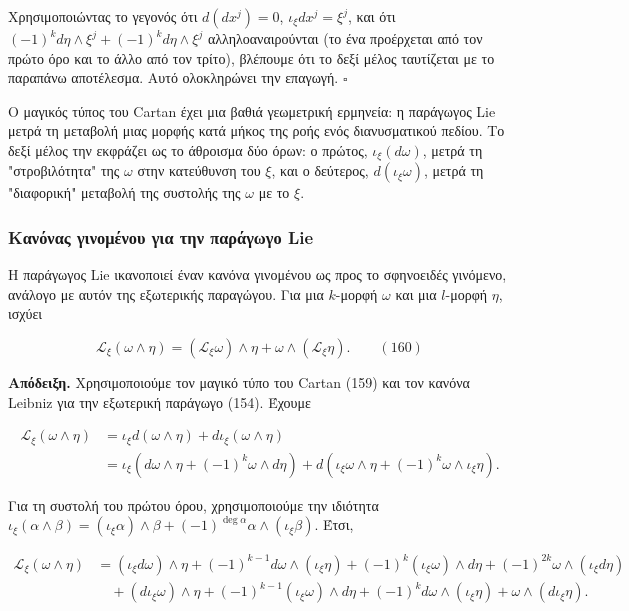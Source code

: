 \documentclass[12pt]{article}
\begin{document}
Χρησιμοποιώντας το γεγονός ότι $d(dx^j) = 0$, $\iota_\xi dx^j = \xi^j$, και ότι $(-1)^k d\eta \wedge \xi^j + (-1)^k d\eta \wedge \xi^j$ αλληλοαναιρούνται (το ένα προέρχεται από τον πρώτο όρο και το άλλο από τον τρίτο), βλέπουμε ότι το δεξί μέλος ταυτίζεται με το παραπάνω αποτέλεσμα. Αυτό ολοκληρώνει την επαγωγή. $\square$

Ο μαγικός τύπος του Cartan έχει μια βαθιά γεωμετρική ερμηνεία: η παράγωγος Lie μετρά τη μεταβολή μιας μορφής κατά μήκος της ροής ενός διανυσματικού πεδίου. Το δεξί μέλος την εκφράζει ως το άθροισμα δύο όρων: ο πρώτος, $\iota_\xi (d\omega)$, μετρά τη "στροβιλότητα" της $\omega$ στην κατεύθυνση του $\xi$, και ο δεύτερος, $d(\iota_\xi \omega)$, μετρά τη "διαφορική" μεταβολή της συστολής της $\omega$ με το $\xi$.

\subsubsection{Κανόνας γινομένου για την παράγωγο Lie}

Η παράγωγος Lie ικανοποιεί έναν κανόνα γινομένου ως προς το σφηνοειδές γινόμενο, ανάλογο με αυτόν της εξωτερικής παραγώγου. Για μια $k$-μορφή $\omega$ και μια $l$-μορφή $\eta$, ισχύει

\[
\mathcal{L}_\xi (\omega \wedge \eta) = (\mathcal{L}_\xi \omega) \wedge \eta + \omega \wedge (\mathcal{L}_\xi \eta). \qquad (160)
\]

\textbf{Απόδειξη.} Χρησιμοποιούμε τον μαγικό τύπο του Cartan (159) και τον κανόνα Leibniz για την εξωτερική παράγωγο (154). Έχουμε

\[
\begin{aligned}
\mathcal{L}_\xi (\omega \wedge \eta) &= \iota_\xi d(\omega \wedge \eta) + d\iota_\xi (\omega \wedge \eta) \\
&= \iota_\xi (d\omega \wedge \eta + (-1)^k \omega \wedge d\eta) + d(\iota_\xi \omega \wedge \eta + (-1)^k \omega \wedge \iota_\xi \eta).
\end{aligned}
\]

Για τη συστολή του πρώτου όρου, χρησιμοποιούμε την ιδιότητα $\iota_\xi (\alpha \wedge \beta) = (\iota_\xi \alpha) \wedge \beta + (-1)^{\deg \alpha} \alpha \wedge (\iota_\xi \beta)$. Έτσι,

\[
\begin{aligned}
\mathcal{L}_\xi (\omega \wedge \eta) &= (\iota_\xi d\omega) \wedge \eta + (-1)^{k-1} d\omega \wedge (\iota_\xi \eta) + (-1)^k (\iota_\xi \omega) \wedge d\eta + (-1)^{2k} \omega \wedge (\iota_\xi d\eta) \\
&\quad + (d\iota_\xi \omega) \wedge \eta + (-1)^{k-1} (\iota_\xi \omega) \wedge d\eta + (-1)^k d\omega \wedge (\iota_\xi \eta) + \omega \wedge (d\iota_\xi \eta).
\end{aligned}
\]
\end{document}
